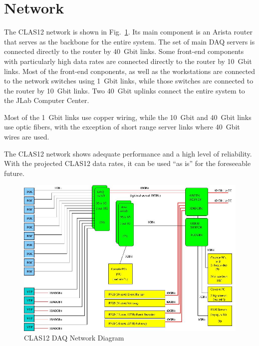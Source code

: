 \section{Network}

The CLAS12 network is shown in Fig.~\ref{fig:network_diagram}. Its main component is an Arista router that serves as the backbone for the entire system. The set of main DAQ servers is connected directly to the router by 40~Gbit links. Some front-end components with particularly high data rates are connected directly to the router by 10~Gbit links. Most of the front-end conponents, as well as the workstations are connected to the network switches using 1~Gbit links, while those switches are connected to the router by 10~Gbit links. Two 40~Gbit uplinks connect the entire system to the JLab Computer Center.

Most of the 1~Gbit links use copper wiring, while the 10~Gbit and 40~Gbit links use optic fibers, with the exception of short range server links where 40~Gbit wires are used.

The CLAS12 network shows adequate performance and a high level of reliability. With the projected CLAS12 data rates, it can be used ``as is'' for the foreseeable future.

\begin{figure}[hbt]
	\centering
	\includegraphics[width=1.0\columnwidth,keepaspectratio]{img/CLAS12_NET_1.jpg}
	\caption{CLAS12 DAQ Network Diagram}
	\label{fig:network_diagram}
\end{figure}
